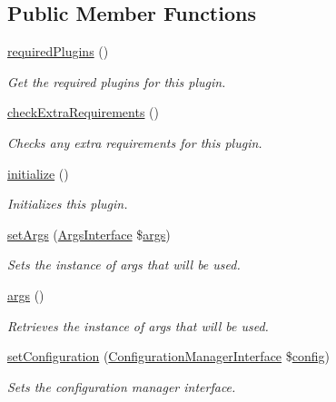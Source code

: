 \subsection*{Public Member Functions}
\begin{DoxyCompactItemize}
\item 
\hyperlink{interfacePluginInterface_a5e05c3866b725af1fd43fa36c64bd922}{required\-Plugins} ()
\begin{DoxyCompactList}\small\item\em Get the required plugins for this plugin. \end{DoxyCompactList}\item 
\hyperlink{interfacePluginInterface_a2710904eb2de8958d13396c558c8b127}{check\-Extra\-Requirements} ()
\begin{DoxyCompactList}\small\item\em Checks any extra requirements for this plugin. \end{DoxyCompactList}\item 
\hyperlink{interfacePluginInterface_aa99b3d9a7b3d99cc603584e5bee521a1}{initialize} ()
\begin{DoxyCompactList}\small\item\em Initializes this plugin. \end{DoxyCompactList}\item 
\hyperlink{interfaceArgsDependency_a254a16af37180b8d36e07d008c2f57f8}{set\-Args} (\hyperlink{interfaceArgsInterface}{Args\-Interface} \$\hyperlink{interfaceArgsDependency_a0f7b28344ad83bbab37c6a18ec74788d}{args})
\begin{DoxyCompactList}\small\item\em Sets the instance of args that will be used. \end{DoxyCompactList}\item 
\hyperlink{interfaceArgsDependency_a0f7b28344ad83bbab37c6a18ec74788d}{args} ()
\begin{DoxyCompactList}\small\item\em Retrieves the instance of args that will be used. \end{DoxyCompactList}\item 
\hyperlink{interfaceConfigurationDependency_a93b2f6f74680415c80eb4cd4fa3b3a82}{set\-Configuration} (\hyperlink{interfaceConfigurationManagerInterface}{Configuration\-Manager\-Interface} \$\hyperlink{interfaceConfigurationDependency_a66f2b69553fee58df04e4a439ed539f1}{config})
\begin{DoxyCompactList}\small\item\em Sets the configuration manager interface. \end{DoxyCompactList}\item 

\end{DoxyCompactItemize}
